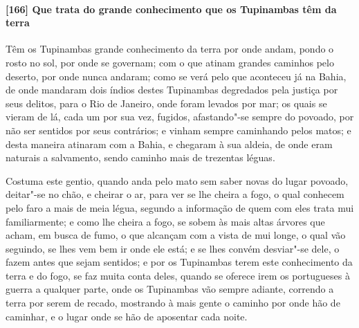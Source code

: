 \paragraph{[166] Que trata do grande conhecimento que os Tupinambas têm da terra}\quad
Têm os Tupinambas grande conhecimento da terra por onde andam, pondo o rosto no sol, por
onde se governam; com o que atinam grandes caminhos pelo deserto, por onde nunca andaram;
como se verá pelo que aconteceu já na Bahia, de onde mandaram dois índios destes
Tupinambas degredados pela justiça por seus delitos, para o Rio de Janeiro, onde foram
levados por mar; os quais se vieram de lá, cada um por sua vez, fugidos, afastando"-se
sempre do povoado, por não ser sentidos por seus contrários; e vinham sempre caminhando
pelos matos; e desta maneira atinaram com a Bahia, e chegaram à sua aldeia, de onde eram
naturais a salvamento, sendo caminho mais de trezentas léguas.

Costuma este gentio, quando anda pelo mato sem saber novas do lugar povoado, deitar"-se no
chão, e cheirar o ar, para ver se lhe cheira a fogo, o qual conhecem pelo faro a mais de
meia légua, segundo a informação de quem com eles trata mui familiarmente; e como lhe
cheira a fogo, se sobem às mais altas árvores que acham, em busca de fumo, o que alcançam
com a vista de mui longe, o qual vão seguindo, se lhes vem bem ir onde ele está; e se lhes
convém desviar"-se dele, o fazem antes que sejam sentidos; e por os Tupinambas terem este
conhecimento da terra e do fogo, se faz muita conta deles, quando se oferece irem os
portugueses à guerra a qualquer parte, onde os Tupinambas vão sempre adiante, correndo a
terra por serem de recado, mostrando à mais gente o caminho por onde hão de caminhar, e o
lugar onde se hão de aposentar cada noite.

